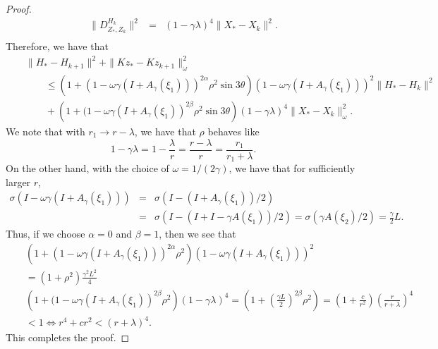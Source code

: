 \begin{proof}
\begin{eqnarray*}
\|D_{Z_*,Z_k}^{H_k}\|^2 &=& (1 - \gamma \lambda)^4 \|X_* - X_k\|^2.  \\ 
\end{eqnarray*}
Therefore, we have that 
\begin{eqnarray*}
&& \|H_{*} - H_{k+1}\|^2 + \|Kz_* - Kz_{k+1}\|^2_{\omega} \\
&& \qquad \leq \left ( 1 + (1 - \omega \gamma (I + A_\gamma(\xi_1)))^{2\alpha}\rho^2 \sin 3\theta \right ) (1 - \omega \gamma (I + A_\gamma(\xi_1)))^2 \|H_* - H_k\|^2  \\
&& \qquad + \left (1 + (1 - \omega\gamma (I + A_\gamma(\xi_1))^{2\beta} \rho^2 \sin 3\theta \right ) (1 - \gamma \lambda)^4  \|X_* - X_k\|_{\omega}^2. 
\end{eqnarray*}
We note that with $r_1 \rightarrow r - \lambda$, we have that $\rho$ behaves like 
\begin{equation} 
1 - \gamma \lambda = 1 - \frac{\lambda}{r} = \frac{r - \lambda}{r} = \frac{r_1}{r_1 + \lambda}.  
\end{equation} 
On the other hand, with the choice of $\omega = 1/(2\gamma)$, we have that for sufficiently larger $r$, 
\begin{eqnarray*}
\sigma(I - \omega \gamma (I + A_\gamma(\xi_1))) &=& \sigma (I - (I + A_\gamma(\xi_1))/2) \\
&=& \sigma (I - (I + I - \gamma A(\xi_1))/2) = \sigma(\gamma A(\xi_2)/2) = \frac{\gamma}{2} L.    
\end{eqnarray*}
Thus, if we choose $\alpha = 0$ and $\beta = 1$, then we see that 
\begin{eqnarray*}
&& \left ( 1 + (1 - \omega \gamma (I + A_\gamma(\xi_1)))^{2\alpha}\rho^2 \right ) (1 - \omega \gamma (I + A_\gamma(\xi_1)))^2 \\
&& = \left ( 1 + \rho^2 \right ) \frac{\gamma^2 L^2}{4} \\
&& \left (1 + (1 - \omega\gamma (I + A_\gamma(\xi_1))^{2\beta} \rho^2 \right ) (1 - \gamma \lambda)^4 = \left ( 1 + \left ( \frac{\gamma L}{2} \right )^{2\beta}\rho^2 \right ) = \left ( 1 + \frac{c}{r^2} \right ) \left (\frac{r}{r + \lambda} \right )^4 \\ 
&& < 1 \Longleftrightarrow r^4 + c r^2 < (r + \lambda)^4. 
\end{eqnarray*}
This completes the proof. 
\end{proof}

